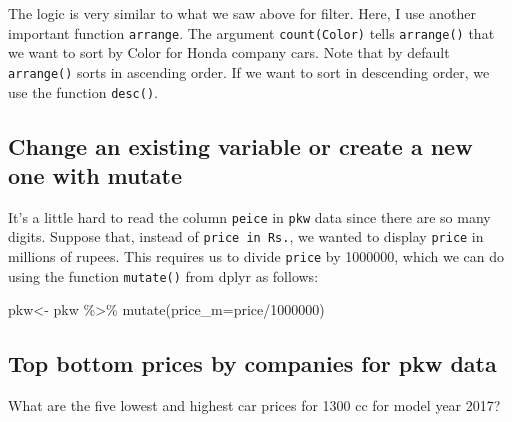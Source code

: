 \documentclass[
  letterpaper,
  DIV=11,
  numbers=noendperiod]{scrartcl}
\newenvironment{Shaded}{\begin{snugshade}}{\end{snugshade}}
\newcommand{\AttributeTok}[1]{\textcolor[rgb]{0.40,0.45,0.13}{#1}}
\newcommand{\DecValTok}[1]{\textcolor[rgb]{0.68,0.00,0.00}{#1}}
\newcommand{\FunctionTok}[1]{\textcolor[rgb]{0.28,0.35,0.67}{#1}}
\newcommand{\NormalTok}[1]{\textcolor[rgb]{0.00,0.23,0.31}{#1}}
\newcommand{\OtherTok}[1]{\textcolor[rgb]{0.00,0.23,0.31}{#1}}
\newcommand{\SpecialCharTok}[1]{\textcolor[rgb]{0.37,0.37,0.37}{#1}}
\begin{document}
The logic is very similar to what we saw above for filter. Here, I use
another important function \texttt{arrange}. The argument
\texttt{count(Color)} tells \texttt{arrange()} that we want to sort by
Color for Honda company cars. Note that by default \texttt{arrange()}
sorts in ascending order. If we want to sort in descending order, we use
the function \texttt{desc()}.

\hypertarget{change-an-existing-variable-or-create-a-new-one-with-mutate}{%
\subsection{Change an existing variable or create a new one with
mutate}\label{change-an-existing-variable-or-create-a-new-one-with-mutate}}

It's a little hard to read the column \texttt{peice} in \texttt{pkw}
data since there are so many digits. Suppose that, instead of
\texttt{price\ in\ Rs.}, we wanted to display \texttt{price} in millions
of rupees. This requires us to divide \texttt{price} by 1000000, which
we can do using the function \texttt{mutate()} from dplyr as follows:

\begin{Shaded}
\begin{Highlighting}[]

\NormalTok{pkw}\OtherTok{\textless{}{-}}\NormalTok{ pkw }\SpecialCharTok{\%\textgreater{}\%} \FunctionTok{mutate}\NormalTok{(}\AttributeTok{price\_m=}\NormalTok{price}\SpecialCharTok{/}\DecValTok{1000000}\NormalTok{)}
\end{Highlighting}
\end{Shaded}

\hypertarget{top-bottom-prices-by-companies-for-pkw-data}{%
\subsection{Top bottom prices by companies for pkw
data}\label{top-bottom-prices-by-companies-for-pkw-data}}

What are the five lowest and highest car prices for 1300 cc for model
year 2017?
\end{document}
